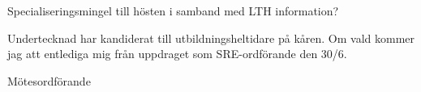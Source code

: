 \documentclass[10pt]{article}
\def\mo{Pontus Landgren}
\begin{document}
\begin{paragrafer}
\item{Specialiseringsmingel till hösten i samband med LTH information?}

Undertecknad har kandiderat till utbildningsheltidare på kåren. Om vald kommer jag att entlediga mig från uppdraget som SRE-ordförande den 30/6.

\end{paragrafer}

\hidesignfoot
\begin{signatures}{1}
\signature{\mo}{Mötesordförande}
\end{signatures}
\end{document}
